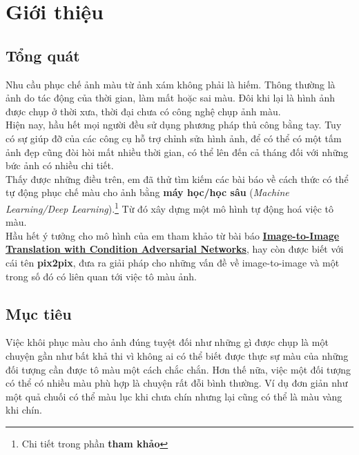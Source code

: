 \documentclass[a4paper]{article}
\begin{document}
\newpage

\tableofcontents

\newpage

\renewcommand{\listfigurename}{Danh sách hình minh hoạ}
\listoffigures

\newpage

\fancyfoot[R]{\scriptsize \ttfamily {\thepage}/\pageref{LastPage}}

\section{Giới thiệu}

\subsection{Tổng quát}
Nhu cầu phục chế ảnh màu từ ảnh xám không phải là hiếm. Thông thường là ảnh do tác động của thời gian, làm mất hoặc sai màu. Đôi khi lại là hình ảnh được chụp ở thời xưa, thời đại chưa có công nghệ chụp ảnh màu.\\
Hiện nay, hầu hết mọi người đều sử dụng phương pháp thủ công bằng tay. Tuy có sự giúp đỡ của các công cụ hỗ trợ chỉnh sửa hình ảnh, để có thể có một tấm ảnh đẹp cũng đòi hòi mất nhiều thời gian, có thể lên đến cả tháng đối với những bức ảnh có nhiều chi tiết.\\

\noindent
Thấy được những điều trên, em đã thử tìm kiếm các bài báo về cách thức có thể tự động phục chế màu cho ảnh bằng \textbf{máy học/học sâu} (\textit{Machine Learning/Deep Learning}).\footnote{Chi tiết trong phần \textbf{ tham khảo}} Từ đó xây dựng một mô hình tự động hoá việc tô màu.\\
Hầu hết ý tưởng cho mô hình của em tham khảo từ bài báo \href{https://arxiv.org/abs/1611.07004}{\textbf{Image-to-Image Translation with Condition Adversarial Networks}}, hay còn được biết với cái tên \textbf{pix2pix}, đưa ra giải pháp cho những vấn đề về image-to-image và một trong số đó có liên quan tới việc tô màu ảnh. 

\subsection{Mục tiêu}\label{objective}
Việc khôi phục màu cho ảnh đúng tuyệt đối như những gì được chụp là một chuyện gần như bất khả thi vì không ai có thể biết được thực sự màu của những đối tượng cần được tô màu một cách chắc chắn. Hơn thế nữa, việc một đối tượng có thể có nhiều màu phù hợp là chuyện rất đỗi bình thường. Ví dụ đơn giản như một quả chuối có thể màu lục khi chưa chín nhưng lại cũng có thể là màu vàng khi chín.
\end{document}
